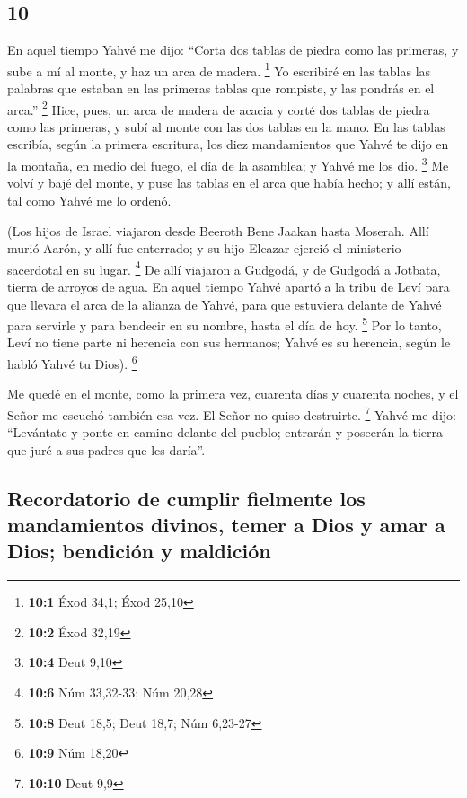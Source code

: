 \begin{paracol}{2}
{\section{10}\label{section-18}}

 En aquel tiempo Yahvé me dijo: ``Corta dos tablas de
piedra como las primeras, y sube a mí al monte, y haz un arca de madera.
\footnote{\textbf{10:1} Éxod 34,1; Éxod 25,10}  Yo
escribiré en las tablas las palabras que estaban en las primeras tablas
que rompiste, y las pondrás en el arca.'' \footnote{\textbf{10:2} Éxod
  32,19}  Hice, pues, un arca de madera de acacia y corté
dos tablas de piedra como las primeras, y subí al monte con las dos
tablas en la mano.  En las tablas escribía, según la
primera escritura, los diez mandamientos que Yahvé te dijo en la
montaña, en medio del fuego, el día de la asamblea; y Yahvé me los dio.
\footnote{\textbf{10:4} Deut 9,10}  Me volví y bajé del
monte, y puse las tablas en el arca que había hecho; y allí están, tal
como Yahvé me lo ordenó.

 (Los hijos de Israel viajaron desde Beeroth Bene Jaakan
hasta Moserah. Allí murió Aarón, y allí fue enterrado; y su hijo Eleazar
ejerció el ministerio sacerdotal en su lugar. \footnote{\textbf{10:6}
  Núm 33,32-33; Núm 20,28}  De allí viajaron a Gudgodá, y
de Gudgodá a Jotbata, tierra de arroyos de agua.  En aquel
tiempo Yahvé apartó a la tribu de Leví para que llevara el arca de la
alianza de Yahvé, para que estuviera delante de Yahvé para servirle y
para bendecir en su nombre, hasta el día de hoy. \footnote{\textbf{10:8}
  Deut 18,5; Deut 18,7; Núm 6,23-27}  Por lo tanto, Leví
no tiene parte ni herencia con sus hermanos; Yahvé es su herencia, según
le habló Yahvé tu Dios). \footnote{\textbf{10:9} Núm 18,20}

 Me quedé en el monte, como la primera vez, cuarenta días
y cuarenta noches, y el Señor me escuchó también esa vez. El Señor no
quiso destruirte. \footnote{\textbf{10:10} Deut 9,9} 
Yahvé me dijo: ``Levántate y ponte en camino delante del pueblo;
entrarán y poseerán la tierra que juré a sus padres que les daría''.

\hypertarget{recordatorio-de-cumplir-fielmente-los-mandamientos-divinos-temer-a-dios-y-amar-a-dios-bendiciuxf3n-y-maldiciuxf3n}{%
\subsection{Recordatorio de cumplir fielmente los mandamientos divinos,
temer a Dios y amar a Dios; bendición y
maldición}\label{recordatorio-de-cumplir-fielmente-los-mandamientos-divinos-temer-a-dios-y-amar-a-dios-bendiciuxf3n-y-maldiciuxf3n}}


\end{paracol}
